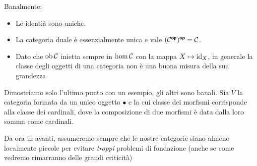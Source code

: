 \documentclass{article}
\renewcommand\C{\mc{C}}
\begin{document}
\begin{remark}{}{}
    Banalmente:\begin{itemize}
        \item Le identià sono uniche.
        \item La categoria duale è essenzialmente unica e vale $(\C^\op)^\op = \C$.
        \item Dato che $\ob\C$ inietta sempre in $\hom\C$ con la mappa $X\mapsto \operatorname{id}_X$, in generale la classe degli oggetti di una categoria non è una buona misura della sua grandezza.
    \end{itemize} 
    \proof 
    Dimostriamo solo l'ultimo punto con un esempio, gli altri sono banali. Sia $V$ la categoria formata da un unico oggetto $\bullet$ e la cui classe dei morfismi corrisponde alla classe dei cardinali, dove la composizione di due morfismi è data dalla loro somma come cardinali.
\end{remark}

Da ora in avanti, assumeremo sempre che le nostre categorie siano almeno localmente piccole per evitare \textit{troppi} problemi di fondazione (anche se come vedremo rimarranno delle grandi criticità)
\end{document}
